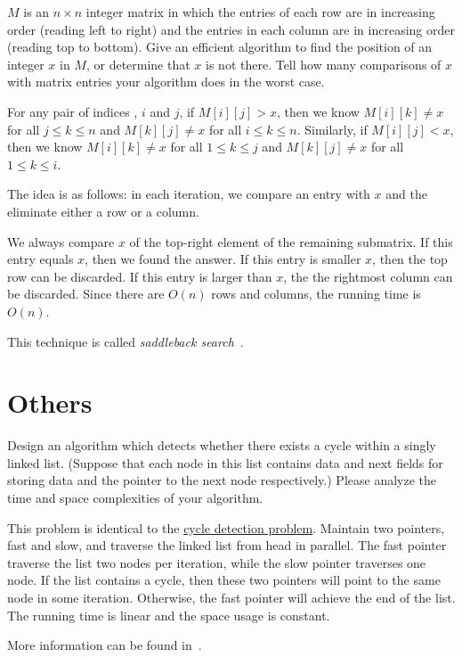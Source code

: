 \begin{Exercise}[origin={NTU CSIE 93}]
$M$ is an $n \times n$ integer matrix in which the entries of each row are in increasing order (reading left to right) and the entries in each column are in increasing order (reading top to bottom). Give an efficient algorithm to find the position of an integer $x$ in $M$, or determine that $x$ is not there. Tell how many comparisons of $x$ with matrix entries your algorithm does in the worst case.
\end{Exercise}
\begin{Answer}
For any pair of indices , $i$ and $j$, if $M[i][j] > x$, then we know $M[i][k] \neq x$ for all $j \leq k \leq n$ and $M[k][j] \neq x$ for all $i \leq k \leq n$. Similarly, if $M[i][j] < x$, then we know $M[i][k] \neq x$ for all $1 \leq k \leq j$ and $M[k][j] \neq x$ for all $1 \leq k \leq i$. 

The idea is as follows: in each iteration, we compare an entry with $x$ and the eliminate either a row or a column.

We always compare $x$ of the top-right element of the remaining submatrix. If this entry equals $x$, then we found the answer. If this entry is smaller $x$, then the top row can be discarded. If this entry is larger than $x$, the the rightmost column can be discarded. Since there are $O(n)$ rows and columns, the running time is $O(n)$. 

\begin{remark}
This technique is called \emph{saddleback search}~\cite{Bird2006}.
\end{remark}
\end{Answer}


\section{Others}
\begin{Exercise}[origin={MCU CSIE 95}]
Design an algorithm which detects whether there exists a cycle within a singly linked list. (Suppose that each node in this list contains data and next fields for storing data and the pointer to the next node respectively.) Please analyze the time and space complexities of your algorithm.
\end{Exercise}
\begin{Answer}
This problem is identical to the \href{https://en.wikipedia.org/wiki/Cycle_detection}{cycle detection problem}. Maintain two pointers, fast and slow, and traverse the linked list from head in parallel. The fast pointer traverse the list two nodes per iteration, while the slow pointer traverses one node. If the list contains a cycle, then these two pointers will point to the same node in some iteration. Otherwise, the fast pointer will achieve the end of the list. The running time is linear and the space usage is constant.

\begin{remark}
More information can be found in~\cite{Nesterenko2012}.
\end{remark}
\end{Answer}

